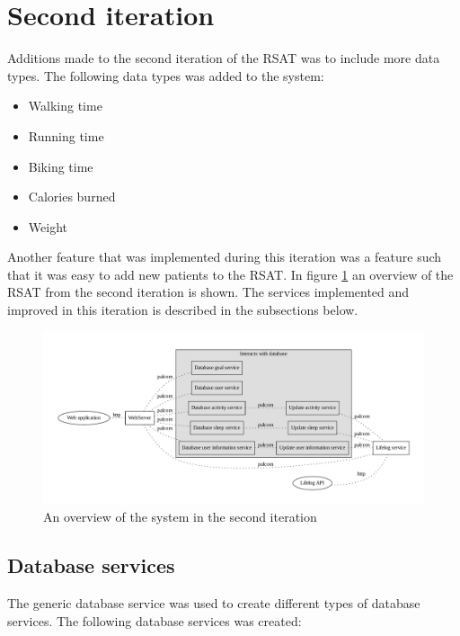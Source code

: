 \documentclass{cslthse-msc}
\begin{document}
\section{Second iteration}

Additions made to the second iteration of the RSAT was to include more data types. The following data types was added to the system: 

\begin{itemize}
	\item Walking time
	\item Running time
	\item Biking time
	\item Calories burned
	\item Weight
\end{itemize}

Another feature that was implemented during this iteration was a feature such that it was easy to add new patients to the RSAT. In figure \ref{fig:second-itr} an overview of the RSAT from the second iteration is shown. The services implemented and improved in this iteration is described in the subsections below. 

\begin{figure}[!hbt]
\centering
\includegraphics[scale=0.4]{forth-version.pdf} 
\caption{An overview of the system in the second iteration}\label{fig:second-itr}
\end{figure}


\subsection{Database services}

The generic database service was used to create different types of database services. The following database services was created: 
\end{document}
